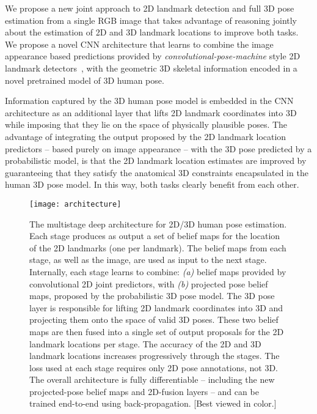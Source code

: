 \documentclass[10pt,twocolumn,letterpaper]{article}
\begin{document}
We propose a new joint approach to 2D landmark detection and full 3D
pose estimation from a single RGB image that takes advantage of
reasoning jointly about the estimation of 2D and 3D landmark locations
to improve both tasks.  We propose a novel CNN architecture that
learns to combine the image appearance based predictions provided by
\emph{convolutional-pose-machine} style 2D landmark
detectors~\cite{wei2016convolutional}, with the geometric 3D skeletal
information encoded in a novel pretrained model of 3D human pose. 

Information captured by the 3D human pose model is embedded in the CNN architecture as an additional layer that
lifts 2D landmark coordinates into 3D while imposing that they lie on the
space of physically plausible poses. The advantage of integrating the
output proposed by the 2D landmark location predictors -- based purely on
image appearance -- with the 3D pose predicted by a probabilistic model,
is that the 2D landmark location estimates are improved by guaranteeing
that they satisfy the anatomical 3D constraints encapsulated in the
human 3D pose model. In this way, both tasks clearly benefit from each
other.

\begin{figure*}\vspace{-7mm}
\begin{center}
\texttt{[image: architecture]}
\end{center}
\vspace{-7mm}
\caption{\small The multistage deep architecture for 2D/3D human pose
  estimation. Each stage produces as output a set of belief maps
  for the location of the 2D landmarks (one per landmark). The belief
  maps from each stage, as well as the image, are used as input to
  the next stage. Internally, each stage learns to combine: \emph{(a)}
  belief maps provided by convolutional 2D joint predictors, with
  \emph{(b)} projected pose belief maps, proposed by the probabilistic
  3D pose model. 
The 3D pose layer is responsible for lifting 2D landmark
     coordinates into 3D and projecting them onto the space of valid
     3D poses.  These two belief maps are then fused into a single set
     of output proposals for the 2D landmark locations per stage.  The
     accuracy of the 2D and 3D landmark locations increases
     progressively through the stages. The loss used at each stage requires only 2D pose annotations, not 3D. The overall architecture is
     fully differentiable -- including the new projected-pose belief
     maps and 2D-fusion layers -- and can be
     trained end-to-end using
     back-propagation. [Best viewed in color.] \label{fig:pipeline}}\vspace{-5mm}
\end{figure*}
\end{document}
